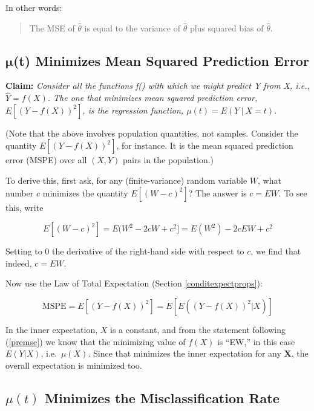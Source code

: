In other words:

\begin{quote}
The MSE of $\widehat{\theta}$ is equal to the 
variance of $\widehat{\theta}$ plus
squared bias of $\widehat{\theta}$.
\end{quote}

\subsection{$\mathbf{\mu}$(t) Minimizes Mean Squared Prediction Error}
\label{optimalmspe}

{\bf Claim:} {\it Consider all the functions f() with which we might
predict Y from X, i.e., $\widehat{Y} = f(X)$. The one that
minimizes mean squared prediction error, $E[(Y - f(X))^2]$, is
the regression function, $\mu(t) = E(Y ~|~ X = t).$}

(Note that the above involves population quantities, not samples.
Consider the quantity $E[(Y - f(X))^2]$, for instance.  It is the mean
squared prediction error (MSPE) over all $(X,Y)$ pairs in the
population.)

To derive this, first ask, for any (finite-variance) random variable
$W$, what number $c$ minimizes the quantity $E[(W - c)^2]$?  The
answer is $c = EW$.  To see this, 
write

\begin{equation}
\label{premse}
E[(W - c)^2] = E(W^2 - 2cW + c^2] = E(W^2) - 2c EW + c^2
\end{equation}

Setting to 0 the derivative of the right-hand side with respect to $c$,
we find that indeed, $c = EW$.

Now use the Law of Total Expectation (Section \ref{conditexpectprops}):

\begin{equation}
\textrm{MSPE} = E[(Y - f(X))^2] = 
E \left [
E( (Y - f(X))^2 | X)
\right ]
\end{equation}

In the inner expectation, $X$ is a constant, and from the statement
following (\ref{premse}) we know that the minimizing value of $f(X)$ is
``EW,'' in this case $E(Y | X)$, i.e.\ $\mu(X)$.  Since that minimizes
the inner expectation for any {\bf X}, the overall expectation is
minimized too.

\subsection{$\mu(t)$ Minimizes the Misclassification Rate}
\label{minerr}

